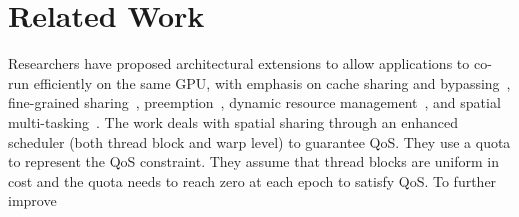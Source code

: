 \section{Related Work}
\vspace{-0.2cm}
Researchers have proposed architectural extensions to allow %
applications to co-run efficiently
on the same GPU, with emphasis on cache sharing and bypassing~\cite{Liang:ICCAD17},
fine-grained sharing~\cite{Wang:ISCA2017},
preemption~\cite{Park+:ASPLOS15,Tanasic+:ISCA14}, dynamic resource management~\cite{Park:ASPLOS17}, 
and spatial multi-tasking~\cite{Adriaens+:HPCA12,slate2019}. The work \cite{Wang:ISCA2017} deals with spatial sharing through an enhanced scheduler (both thread block and warp level) to 
guarantee QoS. They use a quota to represent the QoS constraint. They assume that thread blocks are uniform in cost and the quota needs to reach zero at each epoch to satisfy QoS. To further improve 
